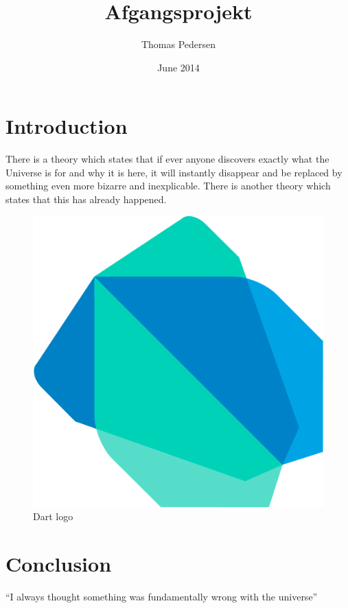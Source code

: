 \documentclass{article}
\title{Afgangsprojekt}
\author{Thomas Pedersen }
\date{June 2014}
\begin{document}
\maketitle

\section{Introduction}
There is a theory which states that if ever anyone discovers exactly what the Universe is for and why it is here, it will instantly disappear and be replaced by something even more bizarre and inexplicable.
There is another theory which states that this has already happened.

\begin{figure}[h!]
\centering
\includegraphics[scale=0.1]{dart-logo.png}
\caption{Dart logo}
\label{fig:dart}
\end{figure}




\section{Conclusion}
``I always thought something was fundamentally wrong with the universe''



\end{document}
